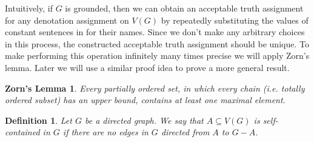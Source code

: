 \documentclass[12pt]{kluwer}
\newtheorem{defn}{Definition}
\newtheorem*{zorn}{Zorn's Lemma}
\theoremstyle{remark}
\begin{document}
Intuitively, if $G$ is grounded, then we can obtain an acceptable truth assignment for any denotation assignment on $V(G)$ by repeatedly substituting the values of constant sentences in for their names.  Since we don't make any arbitrary choices in this process, the constructed acceptable truth assignment should be unique.  To make performing this operation infinitely many times precise we will apply Zorn's lemma.  Later we will use a similar proof idea to prove a more general result.

\begin{zorn}
Every partially ordered set, in which every chain (i.e. totally ordered subset) has an upper bound, contains at least one maximal element.
\end{zorn}

\begin{defn}
Let $G$ be a directed graph.  We say that $A \subseteq V(G)$ is \emph{self-contained} in $G$ if there are no edges in $G$ directed from $A$ to $G - A$.  
\end{defn}
\end{document}
